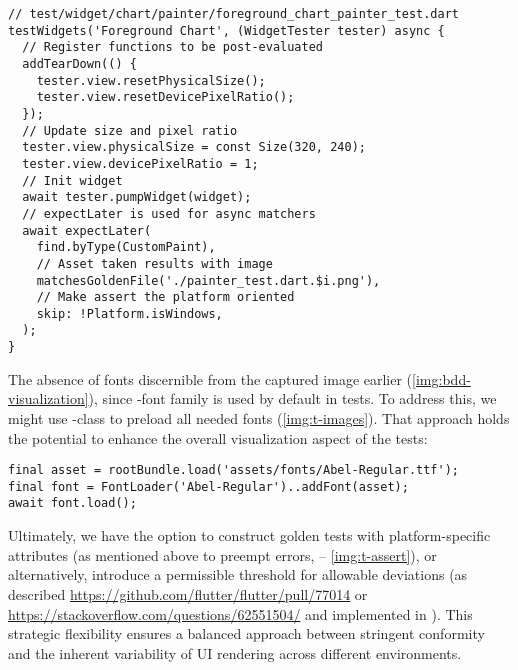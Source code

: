 \begin{lstlisting}
// test/widget/chart/painter/foreground_chart_painter_test.dart
testWidgets('Foreground Chart', (WidgetTester tester) async {
  // Register functions to be post-evaluated
  addTearDown(() {
    tester.view.resetPhysicalSize();
    tester.view.resetDevicePixelRatio();
  });
  // Update size and pixel ratio
  tester.view.physicalSize = const Size(320, 240);
  tester.view.devicePixelRatio = 1;
  // Init widget
  await tester.pumpWidget(widget);
  // expectLater is used for async matchers
  await expectLater(
    find.byType(CustomPaint),
    // Asset taken results with image
    matchesGoldenFile('./painter_test.dart.$i.png'),
    // Make assert the platform oriented
    skip: !Platform.isWindows,
  );
}
\end{lstlisting}

The absence of fonts discernible from the captured image earlier (\cref{img:bdd-visualization}), since -font 
family is used by default in tests. To address this, we might use -class to preload all needed fonts
(\cref{img:t-images}). That approach holds the potential to enhance the overall visualization aspect of the tests:

\begin{lstlisting}
final asset = rootBundle.load('assets/fonts/Abel-Regular.ttf');
final font = FontLoader('Abel-Regular')..addFont(asset);
await font.load();
\end{lstlisting}

Ultimately, we have the option to construct golden tests with platform-specific attributes (as mentioned above to 
preempt errors, -- \cref{img:t-assert}), or alternatively, introduce a permissible threshold for allowable deviations 
(as described 
\href{https://github.com/flutter/flutter/pull/77014\#issuecomment-1048896776}{https://github.com/flutter/flutter/pull/77014}
or \href{https://stackoverflow.com/questions/62551504/flutter-golden-image-tests-diff-threshold}{https://stackoverflow.com/questions/62551504/}
and implemented in ). This strategic flexibility ensures a balanced approach between stringent 
conformity and the inherent variability of UI rendering across different environments.

